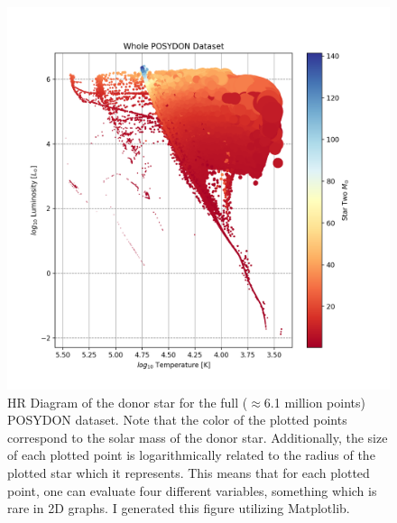 \documentclass[12pt, a4paper]{article}
\begin{document}
    \begin{figure} [H]
        \centering
        \includegraphics[scale = .5]{figs/WholePOSYDONDatasetExample.png}
        \caption{HR Diagram of the donor star for the full ($\approx$6.1 million points) POSYDON dataset. Note that the color of the plotted points correspond to the solar mass of the donor star. Additionally, the size of each plotted point is logarithmically related to the radius of the plotted star which it represents. This means that for each plotted point, one can evaluate four different variables, something which is rare in 2D graphs. I generated this figure utilizing Matplotlib.}
        \label{EntireDataSetHR}
    \end{figure}
\end{document}
